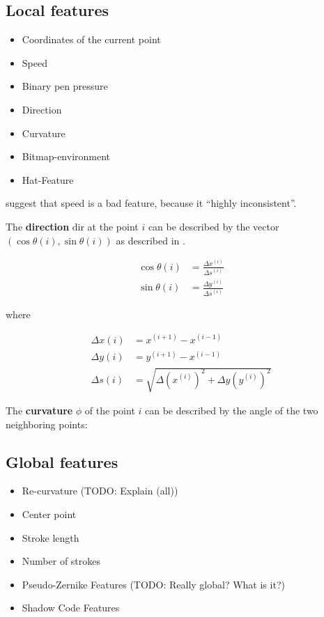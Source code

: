 \subsection{Local features}
\begin{itemize}
    \item Coordinates of the current point\cite{Guyon91}
    \item Speed\cite{Huang09,ICASSP-94}
    \item Binary pen pressure\cite{Kosmala98,Kosmala11,ICASSP-94}
    \item Direction\cite{Manke95,Huang06}
    \item Curvature\cite{Groner66,Manke95,ICASSP-94,Guyon91}
    \item Bitmap-environment\cite{Manke95}
    \item Hat-Feature\cite{ICASSP-94,Manke00}
\end{itemize}

\cite{Kosmala98,Kosmala11} suggest that speed is a bad feature, because it \enquote{highly inconsistent}.

The \textbf{direction} $\text{dir}$ at the point $i$ can be described by the vector 
$(\cos \theta(i), \sin \theta(i))$ as described in \cite{Guyon91}.

\begin{align}
    \cos \theta(i) &= \frac{\Delta x^{(i)}}{\Delta s^{(i)}}\\
    \sin \theta(i) &= \frac{\Delta y^{(i)}}{\Delta s^{(i)}}
\end{align}

where

\begin{align}
    \Delta x (i) &= x^{(i+1)} - x^{(i-1)}\\
    \Delta y (i) &= y^{(i+1)} - x^{(i-1)}\\
    \Delta s (i) &= \sqrt{\Delta (x^{(i)})^2 + \Delta y (y^{(i)})^2}
\end{align}

The \textbf{curvature} $\phi$ of the point $i$ can be described by the
angle of the two neighboring points:


\subsection{Global features}
\begin{itemize}
    \item Re-curvature\cite{Huang06} (TODO: Explain (all))
    \item Center point\cite{Huang06}
    \item Stroke length\cite{Huang06}
    \item Number of strokes\cite{Huang09}
    \item Pseudo-Zernike Features (TODO: Really global? What is it?)\cite{Khotanzad}
    \item Shadow Code Features\cite{Khotanzad}
\end{itemize}